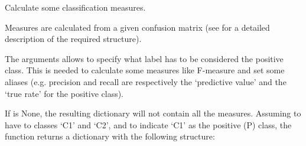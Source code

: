 \documentclass[letterpaper,10pt,english]{sphinxmanual}
\begin{document}
\begin{fulllineitems}
\label{\detokenize{api:palladio.utils.classification_measures}}
Calculate some classification measures.

Measures are calculated from a given confusion matrix
(see {\hyperref[\detokenize{api:palladio.utils.confusion_matrix}]{}} for a detailed description of the
required structure).

The  arguments allows to specify what label has to be
considered the positive class. This is needed to calculate some
measures like F-measure and set some aliases (e.g. precision and recall
are respectively the `predictive value' and the `true rate' for the
positive class).

If  is None, the resulting dictionary will not
contain all the measures. Assuming to have to classes `C1' and `C2',
and to indicate `C1' as the positive (P) class, the function returns a
dictionary with the following structure:

\begin{sphinxVerbatim}[commandchars=\\\{\}]
        
                    
        
                    
                      
             
                           


\end{sphinxVerbatim}
\end{fulllineitems}
\end{document}
